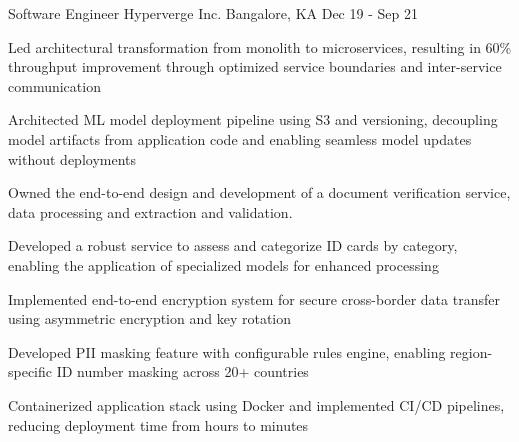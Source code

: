 \begin{cventries}
  \cventry
    {Software Engineer}
    {Hyperverge Inc.}
    {Bangalore, KA}
    {Dec 19  - Sep 21}
    {
      \begin{cvitems}
        \item {Led architectural transformation from monolith to microservices, resulting in 60\% throughput improvement through optimized service boundaries and inter-service communication}
        \item {Architected ML model deployment pipeline using S3 and versioning, decoupling model artifacts from application code and enabling seamless model updates without deployments}
        \item {Owned the end-to-end design and development of a document verification service, data processing and extraction and validation.}
        \item {Developed a robust service to assess and categorize ID cards by category, enabling the application of specialized models for enhanced processing}
        \item {Implemented end-to-end encryption system for secure cross-border data transfer using asymmetric encryption and key rotation}
        \item {Developed PII masking feature with configurable rules engine, enabling region-specific ID number masking across 20+ countries}
        \item {Containerized application stack using Docker and implemented CI/CD pipelines, reducing deployment time from hours to minutes}
      \end{cvitems}
    }

\end{cventries}
